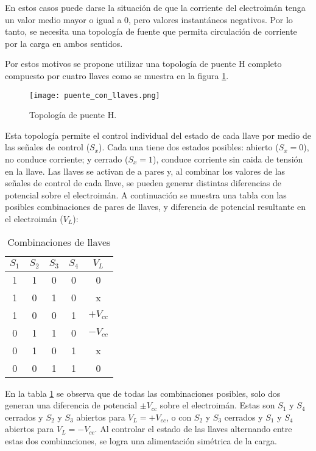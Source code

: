 En estos casos puede darse la situación de que la corriente del electroimán tenga un valor medio mayor o igual a 0, pero valores instantáneos negativos. Por lo tanto, se necesita una topología de fuente que permita circulación de corriente por la carga en ambos sentidos.

Por estos motivos se propone utilizar una topología de puente H completo compuesto por cuatro llaves como se muestra en la figura \ref{fig:img_topologia_simplificada}.

\begin{figure}[H]
	\centering
	\texttt{[image: puente\_con\_llaves.png]}
	\caption{Topología de puente H.}
	\label{fig:img_topologia_simplificada}
\end{figure}

Esta topología permite el control individual del estado de cada llave por medio de las señales de control ($S_x$). Cada una tiene dos estados posibles: abierto ($S_x=0$), no conduce corriente; y cerrado ($S_x=1$), conduce corriente sin caida de tensión en la llave. Las llaves se activan de a pares y, al combinar los valores de las señales de control de cada llave, se pueden generar distintas diferencias de potencial sobre el electroimán. A continuación se muestra una tabla con las posibles combinaciones de pares de llaves, y diferencia de potencial resultante en el electroimán ($V_L$):

\begin{table}[H]
	\begin{center}
		\begin{tabular}{| c | c | c | c | c |}
			\hline
			$S_1$ & $S_2$ & $S_3$ & $S_4$ & $V_L$ \\ \hline
			1 & 1 & 0 & 0 & 0 \\ \hline 
			1 & 0 & 1 & 0 & x \\ \hline 
			1 & 0 & 0 & 1 & $+V_{cc}$ \\ \hline 
			0 & 1 & 1 & 0 & $-V_{cc}$ \\ \hline 
			0 & 1 & 0 & 1 & x \\ \hline 
			0 & 0 & 1 & 1 & 0 \\ \hline 
		\end{tabular}
		\caption{Combinaciones de llaves}
		\label{tab_llaves}
	\end{center}
\end{table}

En la tabla \ref{tab_llaves} se observa que de todas las combinaciones posibles, solo dos generan una diferencia de potencial $\pm V_{cc}$ sobre el electroimán. Estas son  $S_1$ y $S_4$ cerrados y $S_2$ y $S_3$ abiertos para $V_L=+V_{cc}$, o con $S_2$ y $S_3$ cerrados y $S_1$ y $S_4$ abiertos para $V_L=-V_{cc}$. Al controlar el estado de las llaves alternando entre estas dos combinaciones, se logra una alimentación simétrica de la carga.

